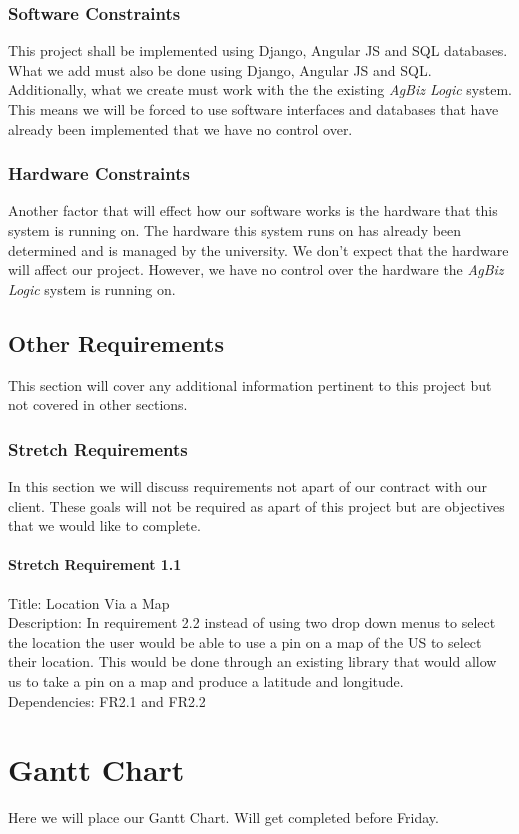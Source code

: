 \documentclass[onecolumn, draftclsnofoot,10pt, compsoc]{article}
\begin{document}
			\subsubsection{Software Constraints}
				This project shall be implemented using Django, Angular JS and SQL databases. What we add must also be done using Django, Angular JS and SQL.\\

				Additionally, what we create must work with the the existing \textit{AgBiz Logic} system. This means we will be forced to use software interfaces and databases that have already been implemented that we have no control over.\\

			\subsubsection{Hardware Constraints}
				Another factor that will effect how our software works is the hardware that this system is running on. The hardware this system runs on has already been determined and is managed by the university. We don't expect that the hardware will affect our project. However, we have no control over the hardware the \textit{AgBiz Logic} system is running on.\\

    \subsection{Other Requirements}
				This section will cover any additional information pertinent to this project but not covered in other sections.\\
				\subsubsection{Stretch Requirements}
				In this section we will discuss requirements not apart of our contract with our client. These goals will not be required as apart of this project but are objectives that we would like to complete.\\
					\paragraph{Stretch Requirement 1.1}
						Title: Location Via a Map\\
						Description: In requirement 2.2 instead of using two drop down menus to select the location the user would be able to use a pin on a map of the US to select their location. This would be done through an existing library that would allow us to take a pin on a map and produce a latitude and longitude.\\
						Dependencies: FR2.1 and FR2.2\\
\section{Gantt Chart}

Here we will place our Gantt Chart. Will get completed before Friday.\\
\end{document}
